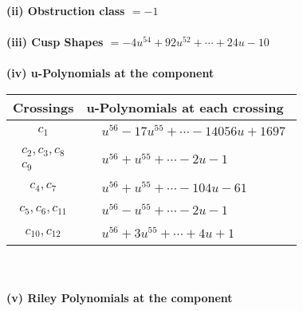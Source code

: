 \documentclass[1p]{elsarticle_modified}
\theoremstyle{definition}
\begin{document}
\flushleft \textbf{(ii) Obstruction class $= -1$}\\~\\
\flushleft \textbf{(iii) Cusp Shapes $= -4 u^{54}+92 u^{52}+\cdots+24 u-10$}\\~\\
\newpage\renewcommand{\arraystretch}{1}
\flushleft \textbf{(iv) u-Polynomials at the component}\newline \\
\begin{tabular}{m{50pt}|m{274pt}}
Crossings & \hspace{64pt}u-Polynomials at each crossing \\
\hline $$\begin{aligned}c_{1}\end{aligned}$$&$\begin{aligned}
&u^{56}-17 u^{55}+\cdots-14056 u+1697
\end{aligned}$\\
\hline $$\begin{aligned}c_{2},c_{3},c_{8}\\c_{9}\end{aligned}$$&$\begin{aligned}
&u^{56}+u^{55}+\cdots-2 u-1
\end{aligned}$\\
\hline $$\begin{aligned}c_{4},c_{7}\end{aligned}$$&$\begin{aligned}
&u^{56}+u^{55}+\cdots-104 u-61
\end{aligned}$\\
\hline $$\begin{aligned}c_{5},c_{6},c_{11}\end{aligned}$$&$\begin{aligned}
&u^{56}- u^{55}+\cdots-2 u-1
\end{aligned}$\\
\hline $$\begin{aligned}c_{10},c_{12}\end{aligned}$$&$\begin{aligned}
&u^{56}+3 u^{55}+\cdots+4 u+1
\end{aligned}$\\
\hline
\end{tabular}\\~\\
\newpage\renewcommand{\arraystretch}{1}
\flushleft \textbf{(v) Riley Polynomials at the component}\newline \\
\end{document}
